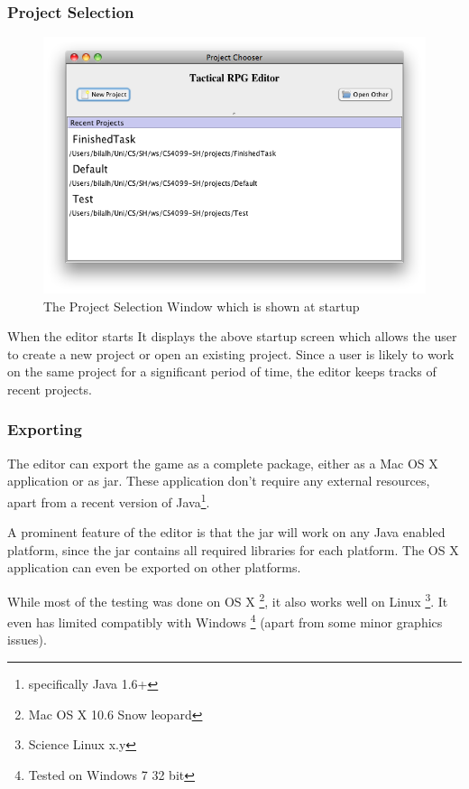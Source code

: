 \subsubsection{Project Selection}
\begin{figure}[htbp]
	\centering
		\includegraphics[width=1.05\textwidth]{figures/editor/Project_Selection.png}
	\caption{The Project Selection Window which is shown at startup}
	\label{fig:figures_editor_Project_Selection}
\end{figure}

When the editor starts It displays the above startup screen which allows the user to create a new project or open an existing project.  Since a user is likely to work on the same project for a significant period of time, the editor keeps tracks of recent projects. 

\clearpage
\subsubsection{Exporting}
\label{ssub:exporting}

The editor can export the game as a complete package, either as a Mac OS X application or as jar. These application don't require any external resources, apart from a recent version of Java\footnote{specifically Java 1.6+}.

A prominent feature of the editor is that the jar will work on any Java enabled platform, since the jar contains all required libraries for each platform. The OS X application can even be exported on other platforms.

While most of the testing was done on OS X \footnote{Mac OS X 10.6 Snow leopard}, it also works well on Linux \footnote{Science  Linux x.y}. It  even has limited compatibly with Windows \footnote{Tested on Windows 7 32 bit} (apart from some minor graphics issues).

